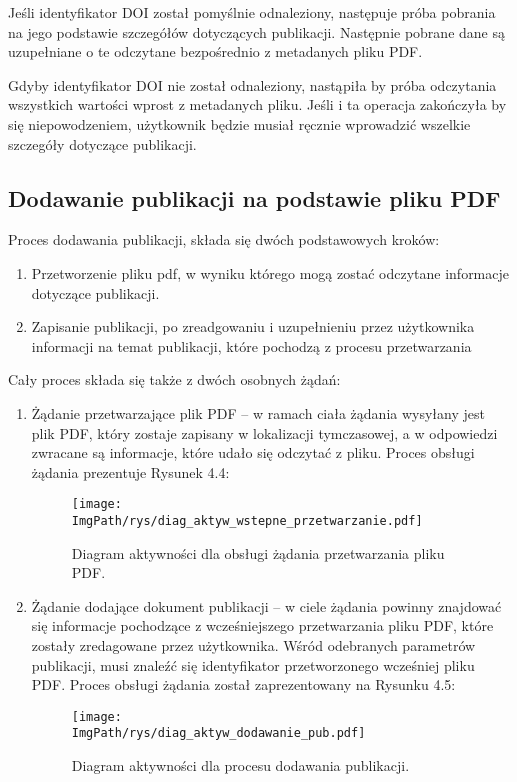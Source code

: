 \documentclass[a4paper,12pt,twoside,openany]{report}
\newcommand{\ImgPath}{.}
\begin{document}
Jeśli identyfikator DOI został pomyślnie odnaleziony, następuje próba pobrania na jego podstawie szczegółów dotyczących publikacji. Następnie pobrane dane są uzupełniane o te odczytane bezpośrednio z metadanych pliku PDF.

Gdyby identyfikator DOI nie został odnaleziony, nastąpiła by próba odczytania wszystkich wartości wprost z metadanych pliku. Jeśli i ta operacja zakończyła by się niepowodzeniem, użytkownik będzie musiał ręcznie wprowadzić wszelkie szczegóły dotyczące publikacji.

\subsection{Dodawanie publikacji na podstawie pliku PDF}
Proces dodawania publikacji, składa się dwóch podstawowych kroków:
\begin{enumerate}
	\item Przetworzenie pliku pdf, w wyniku którego mogą zostać odczytane informacje dotyczące publikacji.
	\item Zapisanie publikacji, po zreadgowaniu i uzupełnieniu przez użytkownika informacji na temat publikacji, które pochodzą z procesu przetwarzania
\end{enumerate}
Cały proces składa się także z dwóch osobnych żądań: 
\begin{enumerate}	
	\item Żądanie przetwarzające plik PDF -- w ramach ciała żądania wysyłany jest plik PDF, który zostaje zapisany w lokalizacji tymczasowej, a w odpowiedzi zwracane są informacje, które udało się odczytać z pliku.  Proces obsługi żądania prezentuje Rysunek 4.4:
	\begin{figure}[!htbp]
		\begin{center}
			\centering
			\texttt{[image: \\ImgPath/rys/diag\_aktyw\_wstepne\_przetwarzanie.pdf]}
		\end{center}
		\caption{Diagram aktywności dla obsługi żądania przetwarzania pliku PDF.}
		\label{diagramAktywnosciDodawanie}
	\end{figure}
	
	\item Żądanie dodające dokument publikacji -- w ciele żądania powinny znajdować się informacje pochodzące z wcześniejszego przetwarzania pliku PDF, które zostały zredagowane przez użytkownika. Wśród odebranych parametrów publikacji, musi znaleźć się identyfikator przetworzonego wcześniej pliku PDF. Proces obsługi żądania został zaprezentowany na Rysunku 4.5:
	\begin{figure}[!htbp]
		\begin{center}
			\centering
			\texttt{[image: \\ImgPath/rys/diag\_aktyw\_dodawanie\_pub.pdf]}
		\end{center}
		\caption{Diagram aktywności dla procesu dodawania publikacji.}
		\label{diagramAktywnosciDodawanie}
	\end{figure}
	
\end{enumerate}
\end{document}
